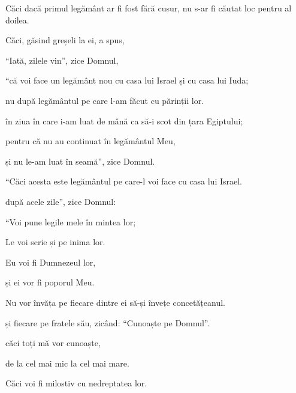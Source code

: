 {\par }{\PP {}Căci dacă primul legământ ar fi fost fără cusur, nu s-ar fi căutat loc pentru al doilea.

Căci, găsind greșeli la ei, a spus,

\par }{\Q “Iată, zilele vin”, zice Domnul,

\par }{\QB “că voi face un legământ nou cu casa lui Israel și cu casa lui Iuda;


\par }{\Q {}nu după legământul pe care l-am făcut cu părinții lor.

\par }{\QB în ziua în care i-am luat de mână ca să-i scot din țara Egiptului;

\par }{\Q pentru că nu au continuat în legământul Meu,

\par }{\QB și nu le-am luat în seamă”, zice Domnul.


\par }{\Q {}“Căci acesta este legământul pe care-l voi face cu casa lui Israel.

\par }{\QB după acele zile”, zice Domnul:

\par }{\Q “Voi pune legile mele în mintea lor;

\par }{\QB Le voi scrie și pe inima lor.

\par }{\Q Eu voi fi Dumnezeul lor,

\par }{\QB și ei vor fi poporul Meu.


\par }{\Q {}Nu vor învăța pe fiecare dintre ei să-și învețe concetățeanul.

\par }{\QB și fiecare pe fratele său, zicând: “Cunoaște pe Domnul”.

\par }{\QB căci toți mă vor cunoaște,

\par }{\QB de la cel mai mic la cel mai mare.


\par }{\Q {}Căci voi fi milostiv cu nedreptatea lor.

}

